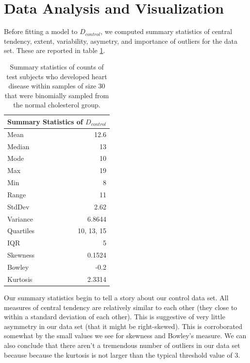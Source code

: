 \documentclass{amsart}
\begin{document}
\section{Data Analysis and Visualization}
Before fitting a model to $D_{control}$, we computed summary statistics of central tendency, extent, variability, asymetry, and importance of outliers for the data set. These are reported in table \ref{Tbl:statistics}.
\begin{table}[h]
\centering
\begin{tabular}{lr}
\toprule
\multicolumn{2}{c}{\textbf{Summary Statistics of $D_{control}$}}\\
\midrule
Mean & 12.6 \\
Median& 13\\
Mode& 10\\
Max& 19\\
Min& 8\\
Range& 11\\
StdDev& 2.62\\
Variance& 6.8644\\
Quartiles& 10, 13, 15\\
IQR& 5\\
Skewness& 0.1524\\
Bowley& -0.2\\
Kurtosis& 2.3314\\
\bottomrule
\end{tabular}
\caption{Summary statistics of counts of test subjects who developed heart disease within samples of size 30 that were binomially sampled from the normal cholesterol group.\label{Tbl:statistics}}
\end{table}
Our summary statistics begin to tell a story about our control data set. All measures of central tendency are relatively similar to each other (they close to within a standard deviation of each other). This is suggestive of very little asymmetry in our data set (that it might be right-skewed). This is corroborated somewhat by the small values we see for skewness and Bowley's measure. We can also conclude that there aren't a tremendous number of outliers in our data set because because the kurtosis is not larger than the typical threshold value of 3.
\end{document}
